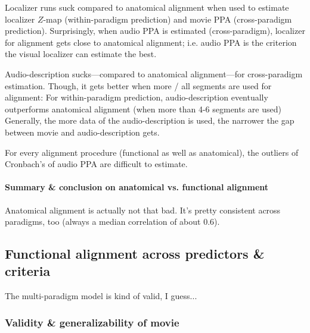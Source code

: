 %
Localizer runs suck compared to anatomical alignment when used to estimate
localizer $Z$-map (within-paradigm prediction) and movie PPA (cross-paradigm
prediction).
%
Surprisingly, when audio PPA is estimated (cross-paradigm), localizer for
alignment gets close to anatomical alignment; i.e. audio PPA is the criterion
the visual localizer can estimate the best.

%
Audio-description sucks---compared to anatomical alignment---for cross-paradigm
estimation.
%
Though, it gets better when more / all segments are used for alignment:
%
For within-paradigm prediction, audio-description eventually outperforms
anatomical alignment (when more than 4-6 segments are used)
%
Generally, the more data of the audio-description is used, the narrower the gap
between movie and audio-description gets.

%
For every alignment procedure (functional as well as anatomical), the outliers
of Cronbach's of audio PPA are difficult to estimate.


\paragraph{Summary \& conclusion on anatomical vs. functional alignment}


Anatomical alignment is actually not that bad.
%
It's pretty consistent across paradigms, too (always a median correlation of
about 0.6).



\subsection{Functional alignment across predictors \& criteria}



The multi-paradigm model is kind of valid, I guess...






\subsubsection{Validity \& generalizability of movie}

